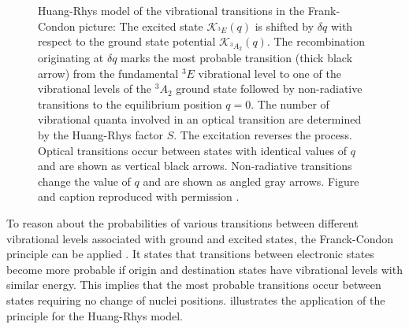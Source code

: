    \begin{figure}[htbp]
     \centering
     \caption[Huang-Rhys model of vibrational transitions]{Huang-Rhys model of the vibrational transitions in the Frank-Condon picture: The excited state $\mathcal{K}_{{}^{3}E}(q)$ is shifted by $\delta q$ with respect to the ground state potential $\mathcal{K}_{{}^{3}A_{2}}(q)$. The recombination originating at $\delta q$ marks the most probable transition (thick black arrow) from the fundamental ${}^{3}E$ vibrational level to one of the vibrational levels of the ${}^{3}A_{2}$ ground state followed by non-radiative transitions to the equilibrium position $q = 0$. The number of vibrational quanta involved in an optical transition are determined by the Huang-Rhys factor $S$. The excitation reverses the process. Optical transitions occur between states with identical values of $q$ and are shown as vertical black arrows. Non-radiative transitions change the value of $q$ and are shown as angled gray arrows. Figure and caption reproduced with permission \cite{Riedrich-moller2014}.}
     \label{fig::huang_rhys_model}
   \end{figure}

   To reason about the probabilities of various transitions between different vibrational levels associated with ground and excited states, the Franck-Condon principle can be applied \cite{condon1947franck}. It states that transitions between electronic states become more probable if origin and destination states have vibrational levels with similar energy. This implies that the most probable transitions occur between states requiring no change of nuclei positions.  illustrates the application of the principle for the Huang-Rhys model.

